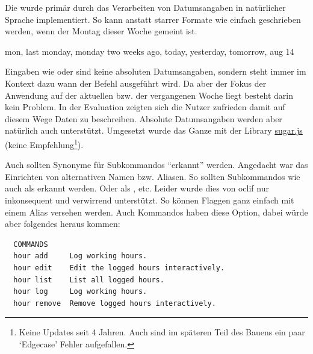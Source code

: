 \documentclass[oneside,bibliography=totocnumbered,BCOR=5mm]{scrbook}
\newenvironment{code}{\captionsetup{type=listing, skip=0pt}}{}
\begin{document}
Die  wurde primär durch das Verarbeiten von
Datumsangaben in natürlicher Sprache implementiert. So kann anstatt starrer
Formate wie  einfach  geschrieben
werden, wenn der Montag dieser Woche gemeint ist.

\begin{code}
  \begin{shellcode}
  mon, last monday, monday two weeks ago, today, yesterday, tomorrow, aug 14
  \end{shellcode}
  \medskip
\end{code}

Eingaben wie  oder  sind keine
absoluten Datumsangaben, sondern steht immer im Kontext dazu wann der Befehl
ausgeführt wird. Da aber der Fokus der Anwendung auf der aktuellen bzw. der
vergangenen Woche liegt besteht darin kein Problem. In der Evaluation zeigten
sich die Nutzer zufrieden damit auf diesem Wege Daten zu beschreiben. Absolute
Datumsangaben werden aber natürlich auch unterstützt. Umgesetzt wurde das
Ganze mit der Library \href{https://sugarjs.com/dates/}{sugar.js} (keine
Empfehlung\footnote{Keine Updates seit 4 Jahren. Auch sind im späteren Teil des
Bauens ein paar `Edgecase' Fehler aufgefallen.}).

\bigskip

Auch sollten Synonyme für Subkommandos ``erkannt'' werden. Angedacht war das
Einrichten von alternativen Namen bzw. Aliasen. So sollten Subkommandos
wie  auch als  erkannt werden. Oder
 als , etc. Leider wurde dies von oclif
nur inkonsequent und verwirrend unterstützt. So können Flaggen ganz einfach mit
einem Alias versehen werden. Auch Kommandos haben diese Option, dabei würde aber
folgendes heraus kommen:

\begin{code}
  \begin{verbatim}
  COMMANDS
  hour add     Log working hours.
  hour edit    Edit the logged hours interactively.
  hour list    List all logged hours.
  hour log     Log working hours.
  hour remove  Remove logged hours interactively.
  \end{verbatim}
  \medskip
\end{code}
\end{document}
